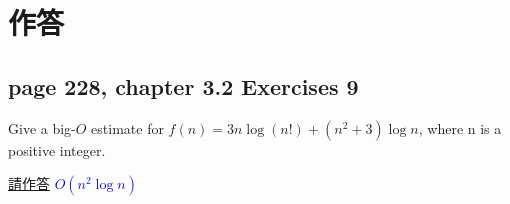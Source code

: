 \documentclass[sigconf]{acmart}
\newcommand{\answer}[2]{%
  \if\relax\detokenize{#2}\relax
    \underline{\mbox{請作答}}%
  \else
    \textcolor{blue}{#2}%
  \fi
}
\begin{document}
\section{作答}


\subsection{page 228, chapter 3.2 Exercises 9}
\begin{shaded}
    Give a big-$O$ estimate for $f(n) = 3n \log(n!) + (n^2 + 3) \log n$, where n is a positive integer.
\end{shaded}
\answer{3.2.9a}{$O(n^2\log n)$}
\end{document}
